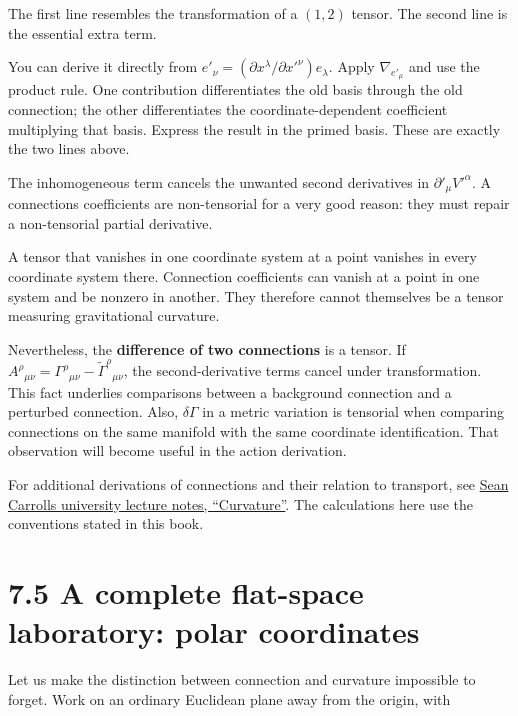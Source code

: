 \documentclass[
  11pt,
  letterpaper,
  oneside,
  openany]{scrbook}
\begin{document}
The first line resembles the transformation of a \((1,2)\) tensor. The
second line is the essential extra term.

You can derive it directly from
\(e'_\nu=(\partial x^\lambda/\partial x'^\nu)e_\lambda\). Apply
\(\nabla_{e'_\mu}\) and use the product rule. One contribution
differentiates the old basis through the old connection; the other
differentiates the coordinate-dependent coefficient multiplying that
basis. Express the result in the primed basis. These are exactly the two
lines above.

The inhomogeneous term cancels the unwanted second derivatives in
\(\partial'_\mu V'^\alpha\). A connection\textquotesingle s coefficients
are non-tensorial for a very good reason: they must repair a
non-tensorial partial derivative.

A tensor that vanishes in one coordinate system at a point vanishes in
every coordinate system there. Connection coefficients can vanish at a
point in one system and be nonzero in another. They therefore cannot
themselves be a tensor measuring gravitational curvature.

Nevertheless, the \textbf{difference of two connections} is a tensor. If
\(A^\rho{}_{\mu\nu}=\Gamma^\rho{}_{\mu\nu}-\widetilde\Gamma^\rho{}_{\mu\nu}\),
the second-derivative terms cancel under transformation. This fact
underlies comparisons between a background connection and a perturbed
connection. Also, \(\delta\Gamma\) in a metric variation is tensorial
when comparing connections on the same manifold with the same coordinate
identification. That observation will become useful in the action
derivation.

For additional derivations of connections and their relation to
transport, see
\href{https://ned.ipac.caltech.edu/level5/March01/Carroll3/Carroll3.html}{Sean
Carroll\textquotesingle s university lecture notes, ``Curvature''}. The
calculations here use the conventions stated in this book.

\hypertarget{a-complete-flat-space-laboratory-polar-coordinates}{%
\section{7.5 A complete flat-space laboratory: polar
coordinates}\label{a-complete-flat-space-laboratory-polar-coordinates}}

Let us make the distinction between connection and curvature impossible
to forget. Work on an ordinary Euclidean plane away from the origin,
with
\end{document}
